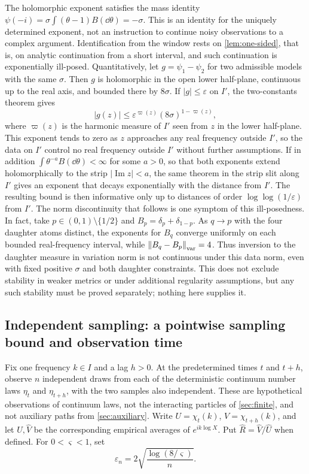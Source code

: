 The holomorphic exponent satisfies the mass identity
$\psi(-i)=\sigma\int(\theta-1)B(\dd\theta)=-\sigma$.
This is an identity for the uniquely determined exponent, not an
instruction to continue noisy observations to a complex argument.
Identification from the window rests on \cref{lem:one-sided}, that is,
on analytic continuation from a short interval, and such continuation is
exponentially ill-posed. Quantitatively, let $g=\psi_1-\psi_2$ for two
admissible models with the same $\sigma$. Then $g$ is holomorphic in the
open lower half-plane, continuous up to the real axis, and bounded there
by $8\sigma$. If $|g|\leq\varepsilon$ on $I'$, the two-constants theorem
gives
\[
 |g(z)|\leq\varepsilon^{\varpi(z)}(8\sigma)^{1-\varpi(z)},
\]
where $\varpi(z)$ is the harmonic measure of $I'$ seen from $z$ in the
lower half-plane. This exponent tends to zero as $z$ approaches any real
frequency outside $I'$, so the data on $I'$ control no real frequency
outside $I'$ without further assumptions. If in addition
$\int\theta^{-a}B(\dd\theta)<\infty$ for some $a>0$, so that both
exponents extend holomorphically to the strip $|\operatorname{Im}z|<a$,
the same theorem in the strip slit along $I'$ gives an exponent that
decays exponentially with the distance from $I'$. The resulting bound
is then informative only up to distances of order
$\log\log(1/\varepsilon)$ from $I'$. The norm discontinuity that follows
is one symptom of this ill-posedness.
In fact, take $p\in(0,1)\setminus\{1/2\}$ and
$B_p=\delta_p+\delta_{1-p}$. As $q\to p$ with the four daughter atoms
distinct, the exponents for $B_q$ converge uniformly on each bounded
real-frequency interval, while
$\left\lVert B_q-B_p\right\rVert_{\mathrm{var}}=4$.
Thus inversion to the daughter measure in variation norm is not continuous
under this data norm, even with fixed positive $\sigma$ and both daughter
constraints. This does not exclude stability in weaker metrics or under
additional regularity assumptions, but any such stability must be proved
separately; nothing here supplies it.

\subsection{Independent sampling: a pointwise sampling bound and observation time}

Fix one frequency $k\in I$ and a lag $h>0$. At the predetermined times
$t$ and $t+h$, observe $n$ independent draws from each of the deterministic
continuum number laws $\eta_t$ and $\eta_{t+h}$, with the two samples
also independent. These are hypothetical observations of continuum laws,
not the interacting particles of \cref{sec:finite}, and not auxiliary
paths from \cref{sec:auxiliary}.
Write $U=\chi_t(k)$, $V=\chi_{t+h}(k)$, and let
$\widehat U,\widehat V$ be the corresponding empirical averages of
$e^{ik\log X}$. Put $\widehat R=\widehat V/\widehat U$ when defined.
For $0<\varsigma<1$, set
\begin{equation}
 \varepsilon_n=2\sqrt{\frac{\log(8/\varsigma)}n}.
 \label{eq:sampling-epsilon}
\end{equation}

